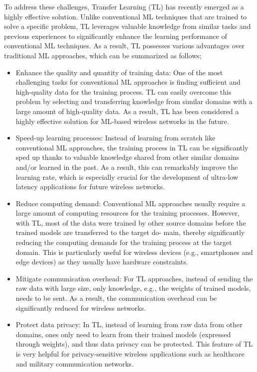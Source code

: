 \documentclass[letterpaper%
, twoside%
, 12pt%
,thesepararticles%
, english%
,creativecommons,hyperref, withAlgo2e%
]{thETS}
\begin{document}
\begin{introduction}
To address these challenges, Transfer Learning (TL) has recently emerged as a highly effective solution. Unlike conventional ML techniques that are trained to solve a specific problem, TL leverages valuable knowledge from similar tasks and previous experiences to significantly enhance the learning performance of conventional ML techniques. As a result, TL possesses various advantages over traditional ML approaches, which can be summarized as follows;
\begin{itemize}
	\item Enhance the quality and quantity of training data: One of the most challenging tasks for conventional ML approaches is finding sufficient and high-quality data for the training process. TL can easily overcome this problem by selecting and transferring knowledge from similar domains with a large amount of high-quality data. As a result, TL has been considered a highly effective solution for ML-based wireless networks in the future.
	\item Speed-up learning processes: Instead of learning from scratch like conventional ML approaches, the training process in TL can be significantly sped up thanks to valuable knowledge shared from other similar domains and/or learned in the past. As a result, this can remarkably improve the learning rate, which is especially crucial for the development of ultra-low latency applications for future wireless networks.
	\item Reduce computing demand: Conventional ML approaches usually require a large amount of computing resources for the training processes. However, with TL, most of the data were trained by other source domains before the trained models are transferred to the target do- main, thereby significantly reducing the computing demands for the training process at the target domain. This is particularly useful for wireless devices (e.g., smartphones and edge devices) as they usually have hardware constraints.
	\item Mitigate communication overhead: For TL approaches, instead of sending the raw data with large size, only knowledge, e.g., the weights of trained models, needs to be sent. As a result, the communication overhead can be significantly reduced for wireless networks.
	\item{Protect data privacy: In TL, instead of learning from raw data from other domains, ones only need to learn from their trained models (expressed through weights), and thus data privacy can be protected. This feature of TL is very helpful for privacy-sensitive wireless applications such as healthcare and military communication networks.}
\end{itemize}

\end{introduction}
\end{document}

